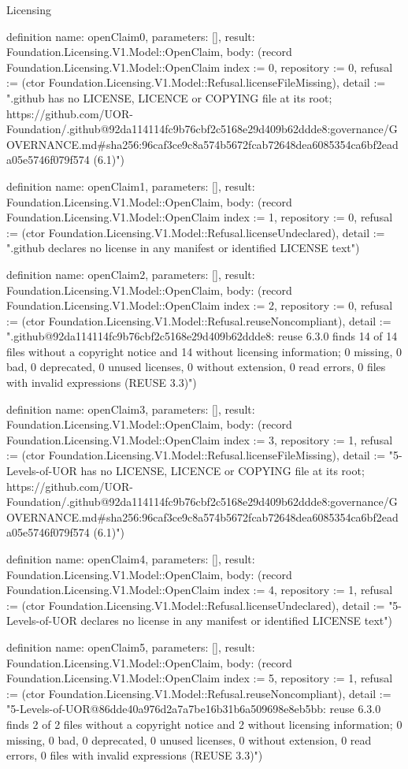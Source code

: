 \begin{lexlean}{Licensing}
\begin{semanticmodule}
definition{
  name: openClaim0,
  parameters: [],
  result: Foundation.Licensing.V1.Model::OpenClaim,
  body: (record Foundation.Licensing.V1.Model::OpenClaim {index := 0, repository := 0, refusal := (ctor Foundation.Licensing.V1.Model::Refusal.licenseFileMissing), detail := ".github has no LICENSE, LICENCE or COPYING file at its root; https://github.com/UOR-Foundation/.github@92da114114fc9b76cbf2c5168e29d409b62ddde8:governance/GOVERNANCE.md#sha256:96caf3ce9c8a574b5672fcab72648dea6085354ca6bf2eada05e5746f079f574 (6.1)"})
}

definition{
  name: openClaim1,
  parameters: [],
  result: Foundation.Licensing.V1.Model::OpenClaim,
  body: (record Foundation.Licensing.V1.Model::OpenClaim {index := 1, repository := 0, refusal := (ctor Foundation.Licensing.V1.Model::Refusal.licenseUndeclared), detail := ".github declares no license in any manifest or identified LICENSE text"})
}

definition{
  name: openClaim2,
  parameters: [],
  result: Foundation.Licensing.V1.Model::OpenClaim,
  body: (record Foundation.Licensing.V1.Model::OpenClaim {index := 2, repository := 0, refusal := (ctor Foundation.Licensing.V1.Model::Refusal.reuseNoncompliant), detail := ".github@92da114114fc9b76cbf2c5168e29d409b62ddde8: reuse 6.3.0 finds 14 of 14 files without a copyright notice and 14 without licensing information; 0 missing, 0 bad, 0 deprecated, 0 unused licenses, 0 without extension, 0 read errors, 0 files with invalid expressions (REUSE 3.3)"})
}

definition{
  name: openClaim3,
  parameters: [],
  result: Foundation.Licensing.V1.Model::OpenClaim,
  body: (record Foundation.Licensing.V1.Model::OpenClaim {index := 3, repository := 1, refusal := (ctor Foundation.Licensing.V1.Model::Refusal.licenseFileMissing), detail := "5-Levels-of-UOR has no LICENSE, LICENCE or COPYING file at its root; https://github.com/UOR-Foundation/.github@92da114114fc9b76cbf2c5168e29d409b62ddde8:governance/GOVERNANCE.md#sha256:96caf3ce9c8a574b5672fcab72648dea6085354ca6bf2eada05e5746f079f574 (6.1)"})
}

definition{
  name: openClaim4,
  parameters: [],
  result: Foundation.Licensing.V1.Model::OpenClaim,
  body: (record Foundation.Licensing.V1.Model::OpenClaim {index := 4, repository := 1, refusal := (ctor Foundation.Licensing.V1.Model::Refusal.licenseUndeclared), detail := "5-Levels-of-UOR declares no license in any manifest or identified LICENSE text"})
}

definition{
  name: openClaim5,
  parameters: [],
  result: Foundation.Licensing.V1.Model::OpenClaim,
  body: (record Foundation.Licensing.V1.Model::OpenClaim {index := 5, repository := 1, refusal := (ctor Foundation.Licensing.V1.Model::Refusal.reuseNoncompliant), detail := "5-Levels-of-UOR@86dde40a976d2a7a7be16b31b6a509698e8eb5bb: reuse 6.3.0 finds 2 of 2 files without a copyright notice and 2 without licensing information; 0 missing, 0 bad, 0 deprecated, 0 unused licenses, 0 without extension, 0 read errors, 0 files with invalid expressions (REUSE 3.3)"})
}


\end{semanticmodule}
\end{lexlean}
